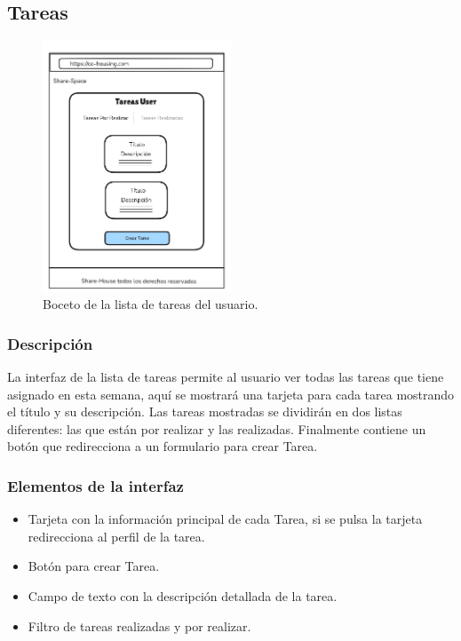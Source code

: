 \subsection{Tareas}
\begin{figure}[H]
    \centering
    \includegraphics[width=0.5\textwidth]{fotos/lista-tareas.png}
    \caption{Boceto de la lista de tareas del usuario.}
    \label{fig:tareas}
\end{figure}
\subsubsection{Descripción}
La interfaz de la lista de tareas permite al usuario ver todas las tareas que tiene asignado en esta semana, aquí se mostrará una tarjeta para cada tarea mostrando el título y su descripción. Las tareas mostradas se dividirán en dos listas diferentes: las que están por realizar y las realizadas. Finalmente contiene un botón que redirecciona a un formulario para crear Tarea.

\subsubsection{Elementos de la interfaz}
\begin{itemize}
  \item Tarjeta con la información principal de cada Tarea, si se pulsa la tarjeta redirecciona al perfil de la tarea.
  \item Botón para crear Tarea.
  \item Campo de texto con la descripción detallada de la tarea.
  \item Filtro de tareas realizadas y por realizar.
\end{itemize}

